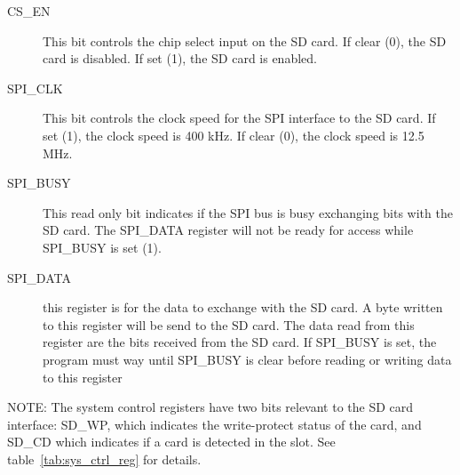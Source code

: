 \begin{description}
    \item[CS\_EN] This bit controls the chip select input on the SD card. If clear (0), the SD card is disabled. If set (1), the SD card is enabled.
    \item[SPI\_CLK] This bit controls the clock speed for the SPI interface to the SD card. If set (1), the clock speed is 400 kHz. If clear (0), the clock speed is 12.5 MHz.
    \item[SPI\_BUSY] This read only bit indicates if the SPI bus is busy exchanging bits with the SD card. The SPI\_DATA register will not be ready for access while SPI\_BUSY is set (1).
    \item[SPI\_DATA] this register is for the data to exchange with the SD card. A byte written to this register will be send to the SD card. The data read from this register are the bits received from the SD card. If SPI\_BUSY is set, the program must way until SPI\_BUSY is clear before reading or writing data to this register
\end{description}

NOTE: The system control registers have two bits relevant to the SD card interface: SD\_WP, which indicates the write-protect status of the card, and SD\_CD which indicates if a card is detected in the slot. See table~\ref{tab:sys_ctrl_reg} for details.
